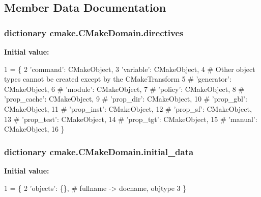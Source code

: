 \subsection{Member Data Documentation}
\subsubsection[{\texorpdfstring{directives}{directives}}]{\setlength{\rightskip}{0pt plus 5cm}dictionary cmake.\+C\+Make\+Domain.\+directives\hspace{0.3cm}{\ttfamily [static]}}\hypertarget{classcmake_1_1CMakeDomain_a4ca0cbe98eb3a38b98df30377f550c08}{}\label{classcmake_1_1CMakeDomain_a4ca0cbe98eb3a38b98df30377f550c08}
{\bfseries Initial value\+:}
\begin{DoxyCode}
1 = \{
2         \textcolor{stringliteral}{'command'}:    CMakeObject,
3         \textcolor{stringliteral}{'variable'}:   CMakeObject,
4         \textcolor{comment}{# Other object types cannot be created except by the CMakeTransform}
5         \textcolor{comment}{# 'generator':  CMakeObject,}
6         \textcolor{comment}{# 'module':     CMakeObject,}
7         \textcolor{comment}{# 'policy':     CMakeObject,}
8         \textcolor{comment}{# 'prop\_cache': CMakeObject,}
9         \textcolor{comment}{# 'prop\_dir':   CMakeObject,}
10         \textcolor{comment}{# 'prop\_gbl':   CMakeObject,}
11         \textcolor{comment}{# 'prop\_inst':  CMakeObject,}
12         \textcolor{comment}{# 'prop\_sf':    CMakeObject,}
13         \textcolor{comment}{# 'prop\_test':  CMakeObject,}
14         \textcolor{comment}{# 'prop\_tgt':   CMakeObject,}
15         \textcolor{comment}{# 'manual':     CMakeObject,}
16     \}
\end{DoxyCode}
\subsubsection[{\texorpdfstring{initial\+\_\+data}{initial_data}}]{\setlength{\rightskip}{0pt plus 5cm}dictionary cmake.\+C\+Make\+Domain.\+initial\+\_\+data\hspace{0.3cm}{\ttfamily [static]}}\hypertarget{classcmake_1_1CMakeDomain_a471a8473fff4f5b8a3eae45e5ca0eea7}{}\label{classcmake_1_1CMakeDomain_a471a8473fff4f5b8a3eae45e5ca0eea7}
{\bfseries Initial value\+:}
\begin{DoxyCode}
1 = \{
2         \textcolor{stringliteral}{'objects'}: \{\},  \textcolor{comment}{# fullname -> docname, objtype}
3     \}
\end{DoxyCode}

